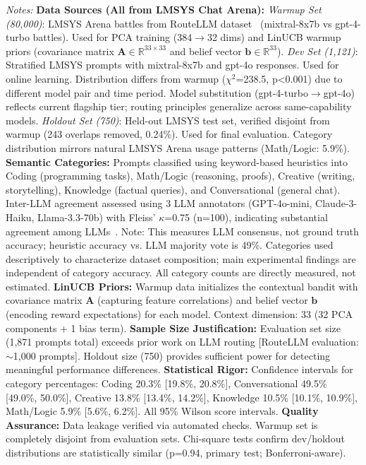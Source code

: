 \begin{table}[t]
\vspace{1em}
\footnotesize
\textit{Notes:}
\textbf{Data Sources (All from LMSYS Chat Arena):}
\textit{Warmup Set (80,000)}: LMSYS Arena battles from RouteLLM dataset~\cite{ong2024routellm} (mixtral-8x7b vs gpt-4-turbo battles). Used for PCA training (384$\rightarrow$32 dims) and LinUCB warmup priors (covariance matrix $\mathbf{A} \in \mathbb{R}^{33 \times 33}$ and belief vector $\mathbf{b} \in \mathbb{R}^{33}$).
\textit{Dev Set (1,121)}: Stratified LMSYS prompts with mixtral-8x7b and gpt-4o responses. Used for online learning. Distribution differs from warmup ($\chi^2$=238.5, p<0.001) due to different model pair and time period. Model substitution (gpt-4-turbo$\rightarrow$gpt-4o) reflects current flagship tier; routing principles generalize across same-capability models.
\textit{Holdout Set (750)}: Held-out LMSYS test set, verified disjoint from warmup (243 overlaps removed, 0.24\%). Used for final evaluation. Category distribution mirrors natural LMSYS Arena usage patterns (Math/Logic: 5.9\%).
\textbf{Semantic Categories:} Prompts classified using keyword-based heuristics into Coding (programming tasks), Math/Logic (reasoning, proofs), Creative (writing, storytelling), Knowledge (factual queries), and Conversational (general chat). Inter-LLM agreement assessed using 3 LLM annotators (GPT-4o-mini, Claude-3-Haiku, Llama-3.3-70b) with Fleiss' $\kappa$=0.75 (n=100), indicating substantial agreement among LLMs~\cite{gilardi2023chatgpt}. Note: This measures LLM consensus, not ground truth accuracy; heuristic accuracy vs. LLM majority vote is 49\%. Categories used descriptively to characterize dataset composition; main experimental findings are independent of category accuracy. All category counts are directly measured, not estimated.
\textbf{LinUCB Priors:} Warmup data initializes the contextual bandit with covariance matrix $\mathbf{A}$ (capturing feature correlations) and belief vector $\mathbf{b}$ (encoding reward expectations) for each model. Context dimension: 33 (32 PCA components + 1 bias term).
\textbf{Sample Size Justification:} Evaluation set size (1,871 prompts total) exceeds prior work on LLM routing [RouteLLM evaluation: $\sim$1,000 prompts]. Holdout size (750) provides sufficient power for detecting meaningful performance differences.
\textbf{Statistical Rigor:} Confidence intervals for category percentages: Coding 20.3\% [19.8\%, 20.8\%], Conversational 49.5\% [49.0\%, 50.0\%], Creative 13.8\% [13.4\%, 14.2\%], Knowledge 10.5\% [10.1\%, 10.9\%], Math/Logic 5.9\% [5.6\%, 6.2\%]. All 95\% Wilson score intervals.
\textbf{Quality Assurance:} Data leakage verified via automated checks. Warmup set is completely disjoint from evaluation sets. Chi-square tests confirm dev/holdout distributions are statistically similar (p=0.94, primary test; Bonferroni-aware).
\end{table}
